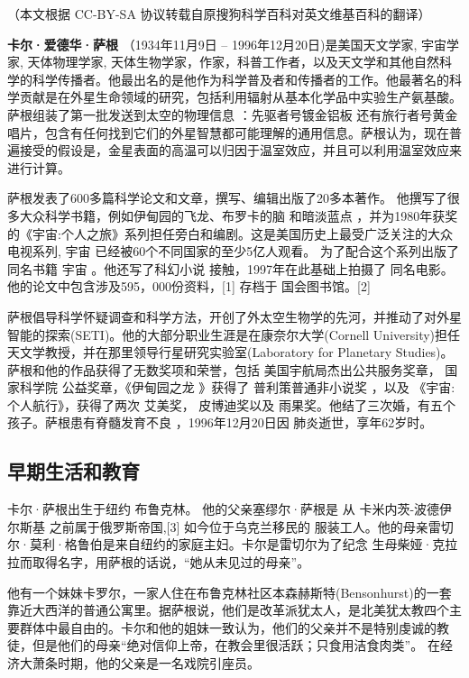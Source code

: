 
（本文根据 CC-BY-SA 协议转载自原搜狗科学百科对英文维基百科的翻译）

\textbf{卡尔·爱德华·萨根} （1934年11月9日 – 1996年12月20日)是美国天文学家, 宇宙学家, 天体物理学家, 天体生物学家，作家，科普工作者，以及天文学和其他自然科学的科学传播者。他最出名的是他作为科学普及者和传播者的工作。他最著名的科学贡献是在外星生命领域的研究，包括利用辐射从基本化学品中实验生产氨基酸。萨根组装了第一批发送到太空的物理信息 ：先驱者号镀金铝板 还有旅行者号黄金唱片，包含有任何找到它们的外星智慧都可能理解的通用信息。萨根认为，现在普遍接受的假设是，金星表面的高温可以归因于温室效应，并且可以利用温室效应来进行计算。

萨根发表了600多篇科学论文和文章，撰写、编辑出版了20多本著作。 他撰写了很多大众科学书籍，例如伊甸园的飞龙、布罗卡的脑 和暗淡蓝点 ，并为1980年获奖的《宇宙:个人之旅》系列担任旁白和编剧。这是美国历史上最受广泛关注的大众电视系列, 宇宙 已经被60个不同国家的至少5亿人观看。 为了配合这个系列出版了同名书籍 宇宙 。他还写了科幻小说 接触，1997年在此基础上拍摄了 同名电影。他的论文中包含涉及595，000份资料，[1] 存档于 国会图书馆。[2]

萨根倡导科学怀疑调查和科学方法，开创了外太空生物学的先河，并推动了对外星智能的探索(SETI)。他的大部分职业生涯是在康奈尔大学(Cornell University)担任天文学教授，并在那里领导行星研究实验室(Laboratory for Planetary Studies)。萨根和他的作品获得了无数奖项和荣誉，包括 美国宇航局杰出公共服务奖章， 国家科学院 公益奖章，《伊甸园之龙 》获得了 普利策普通非小说奖 ，以及 《宇宙:个人航行》，获得了两次 艾美奖， 皮博迪奖以及 雨果奖。他结了三次婚，有五个孩子。萨根患有脊髓发育不良 ，1996年12月20日因 肺炎逝世，享年62岁时。

\subsection{早期生活和教育}
卡尔·萨根出生于纽约 布鲁克林。 他的父亲塞缪尔·萨根是 从 卡米内茨-波德伊尔斯基 之前属于俄罗斯帝国,[3] 如今位于乌克兰移民的 服装工人。他的母亲雷切尔·莫利·格鲁伯是来自纽约的家庭主妇。卡尔是雷切尔为了纪念 生母柴娅·克拉拉而取得名字，用萨根的话说，“她从未见过的母亲”。

他有一个妹妹卡罗尔，一家人住在布鲁克林社区本森赫斯特(Bensonhurst)的一套靠近大西洋的普通公寓里。据萨根说，他们是改革派犹太人，是北美犹太教四个主要群体中最自由的。卡尔和他的姐妹一致认为，他们的父亲并不是特别虔诚的教徒，但是他们的母亲“绝对信仰上帝，在教会里很活跃；只食用洁食肉类”。 在经济大萧条时期，他的父亲是一名戏院引座员。

